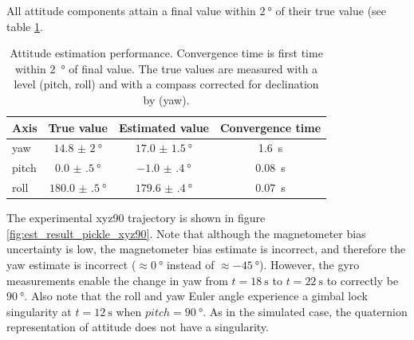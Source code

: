 \documentclass[conference]{IEEEtran}
\begin{document}
All attitude components attain a final value within $\SI{2}{\degree}$ of their true value (see table \ref{table:att_est_perf}.\\

\begin{table}[!t]
    \renewcommand{\arraystretch}{1.3}
    \caption{Attitude estimation performance. Convergence time is first time within \SI{2}{\degree} of final value. The true values are measured with a level (pitch, roll) and with a compass corrected for declination by \cite{wmm} (yaw).}
    \label{table:att_est_perf}
    \centering
    \begin{tabular}{|l|c|c|c|}
        \hline
        Axis & True value & Estimated value & Convergence time \\
        \hline
        yaw & $\SI[separate-uncertainty = true]{14.8(20)}{\degree}$ & $\SI[separate-uncertainty = true]{17.0(15)}{\degree}$ & \SI{1.6}{\second} \\
        \hline
        pitch & $\SI[separate-uncertainty = true]{0.0(5)}{\degree}$ & $\SI[separate-uncertainty = true]{-1.0(4)}{\degree}$ & \SI{0.08}{\second} \\
        \hline
        roll & $\SI[separate-uncertainty = true]{180.0(5)}{\degree}$ & $\SI[separate-uncertainty = true]{179.6(4)}{\degree}$ & \SI{0.07}{\second} \\
        \hline
    \end{tabular}
\end{table}

The experimental xyz90 trajectory is shown in figure \ref{fig:est_result_pickle_xyz90}. Note that although the magnetometer bias uncertainty is low, the magnetometer bias estimate is incorrect, and therefore the yaw estimate is incorrect ($\approx \SI{0}{\degree}$ instead of $\approx \SI{-45}{\degree}$). However, the gyro measurements enable the change in yaw from $t = \SI{18}{\second}$ to $t = \SI{22}{\second}$ to correctly be $\SI{90}{\degree}$. Also note that the roll and yaw Euler angle experience a gimbal lock singularity at $t = \SI{12}{\second}$ when $pitch=\SI{90}{\degree}$. As in the simulated case, the quaternion representation of attitude does not have a singularity. 
\end{document}
